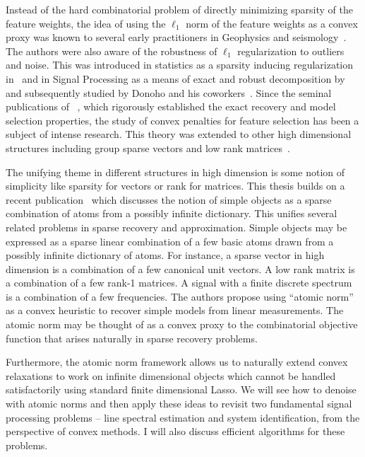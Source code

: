 Instead of the hard combinatorial problem of directly minimizing sparsity of the
feature weights, the idea of using the $\ell_1$ norm of the feature weights as a
convex proxy was known to several early practitioners in Geophysics and
seismology~\cite{claerbout:robust,taylor:deconvolution,levy:spike-train,santosa}.
The authors were also aware of the robustness of $\ell_1$ regularization to
outliers and noise. This was introduced in statistics as a sparsity inducing
regularization in~\cite{tibshirani96} and in Signal Processing as a means of
exact and robust decomposition by~\cite{chen98} and subsequently studied by
Donoho and his coworkers~\cite{donoho:huo,spark}. Since the seminal publications
of ~\cite{CRT06,meinshausen:variable-selection}, which rigorously established
the exact recovery and model selection properties, the study of convex penalties
for feature selection has been a subject of intense research. This theory was
extended to other high dimensional structures including group sparse
vectors\cite{group:lasso} and low rank matrices~\cite{recht07}.



The unifying theme in different structures in high dimension is some notion of
simplicity like sparsity for vectors or rank for matrices. This thesis builds on
a recent publication~\cite{crpw} which discusses the notion of simple objects as
a sparse combination of atoms from a possibly infinite dictionary. This unifies
several related problems in sparse recovery and approximation. Simple objects
may be expressed as a sparse linear combination of a few basic atoms drawn from
a possibly infinite dictionary of atoms. For instance, a sparse vector in high
dimension is a combination of a few canonical unit vectors. A low rank matrix is
a combination of a few rank-1 matrices. A signal with a finite discrete spectrum
is a combination of a few frequencies. The authors propose using ``atomic norm''
as a convex heuristic to recover simple models from linear measurements. The
atomic norm may be thought of as a convex proxy to the combinatorial objective
function that arises naturally in sparse recovery problems.

Furthermore, the atomic norm framework allows us to naturally extend convex
relaxations to work on infinite dimensional objects which cannot be handled
satisfactorily using standard finite dimensional Lasso. We will see how to
denoise with atomic norms and then apply these ideas to revisit two fundamental
signal processing problems -- line spectral estimation and system
identification, from the perspective of convex methods. I will also discuss
efficient algorithms for these problems.

